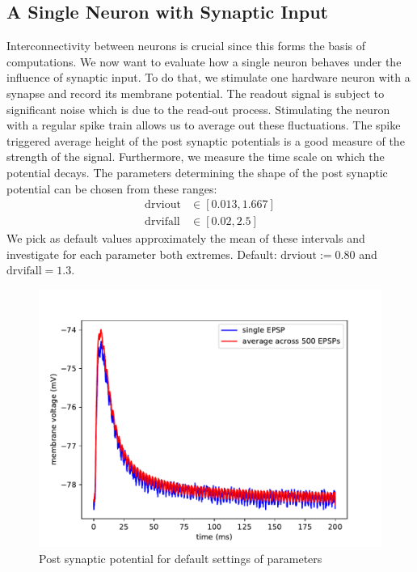 \documentclass[a4paper,twocolumn]{article}
\begin{document}
\subsection{A Single Neuron with Synaptic Input}
Interconnectivity between neurons is crucial since this forms the basis of
computations.  We now want to evaluate how a single neuron behaves under the influence
 of synaptic input.  To do that,  we stimulate one hardware neuron with a synapse
 and record its membrane potential.  The readout signal is subject to significant
 noise which is due to the read-out process.  Stimulating the neuron with a regular
 spike train allows us to average out these fluctuations.  The spike triggered average
 height of the post synaptic potentials is a good measure of the strength of the signal.
 Furthermore,  we measure the time scale on which the potential decays.
The parameters determining the shape of the post synaptic potential can be chosen 
from these ranges:
\begin{align*}
	\text{drviout} &\in \left[ 0.013, 1.667  \right] \\
	\text{drvifall} &\in \left[ 0.02,  2.5  \right]
\end{align*}
We pick as default values approximately the mean of these intervals and
investigate for each parameter both extremes.  Default: $\text{drviout} := 0.80$
and $\text{drvifall}=1.3$.
\begin{figure}[ht]
    \centering
    \includegraphics[width=.5\textwidth]{figures/epsp_default.pdf}
    \caption{Post synaptic potential for default settings of parameters}
    \label{fig:epsp_default}
\end{figure}
\end{document}
